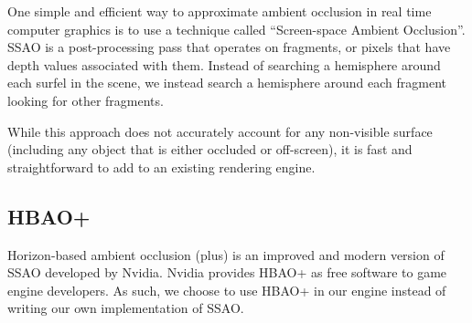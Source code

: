 One simple and efficient way to approximate ambient occlusion in real time computer graphics is to use a technique called ``Screen-space Ambient Occlusion''.
SSAO is a post-processing pass that operates on fragments, or pixels that have depth values associated with them.
Instead of searching a hemisphere around each surfel in the scene, we instead search a hemisphere around each fragment looking for other fragments.

While this approach does not accurately account for any non-visible surface (including any object that is either occluded or off-screen), it is fast and straightforward to add to an existing rendering engine.


\subsection{HBAO+}

Horizon-based ambient occlusion (plus) is an improved and modern version of SSAO developed by Nvidia.
Nvidia provides HBAO+ as free software to game engine developers.
As such, we choose to use HBAO+ in our engine instead of writing our own implementation of SSAO.
